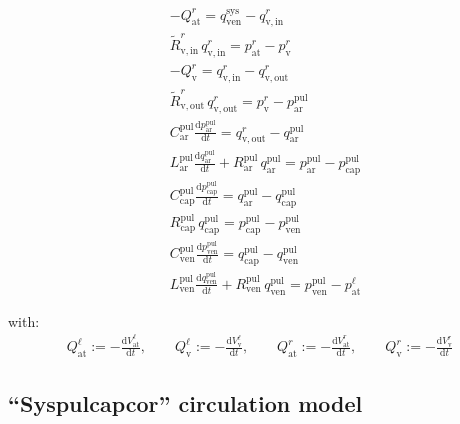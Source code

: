\documentclass[a4paper,12pt]{report}
\begin{document}
\begin{align}
&-Q_{\mathrm{at}}^{r} = q_{\mathrm{ven}}^{\mathrm{sys}} - q_{\mathrm{v,in}}^{r}\nonumber\\
&\tilde{R}_{\mathrm{v,in}}^{r}\,q_{\mathrm{v,in}}^{r} = p_{\mathrm{at}}^{r}-p_{\mathrm{v}}^{r}\nonumber\\
&-Q_{\mathrm{v}}^{r} = q_{\mathrm{v,in}}^{r} - q_{\mathrm{v,out}}^{r}\nonumber\\
&\tilde{R}_{\mathrm{v,out}}^{r}\,q_{\mathrm{v,out}}^{r} = p_{\mathrm{v}}^{r}-p_{\mathrm{ar}}^{\mathrm{pul}}\nonumber\\
&C_{\mathrm{ar}}^{\mathrm{pul}} \frac{\mathrm{d}p_{\mathrm{ar}}^{\mathrm{pul}}}{\mathrm{d}t} = q_{\mathrm{v,out}}^{r} - q_{\mathrm{ar}}^{\mathrm{pul}}\nonumber\\
&L_{\mathrm{ar}}^{\mathrm{pul}}\frac{\mathrm{d}q_{\mathrm{ar}}^{\mathrm{pul}}}{\mathrm{d}t} + R_{\mathrm{ar}}^{\mathrm{pul}}\,q_{\mathrm{ar}}^{\mathrm{pul}}=p_{\mathrm{ar}}^{\mathrm{pul}} -p_{\mathrm{cap}}^{\mathrm{pul}}\nonumber\\
&C_{\mathrm{cap}}^{\mathrm{pul}} \frac{\mathrm{d}p_{\mathrm{cap}}^{\mathrm{pul}}}{\mathrm{d}t} = q_{\mathrm{ar}}^{\mathrm{pul}} - q_{\mathrm{cap}}^{\mathrm{pul}}\nonumber\\
&R_{\mathrm{cap}}^{\mathrm{pul}}\,q_{\mathrm{cap}}^{\mathrm{pul}}=p_{\mathrm{cap}}^{\mathrm{pul}}-p_{\mathrm{ven}}^{\mathrm{pul}}\nonumber\\
&C_{\mathrm{ven}}^{\mathrm{pul}} \frac{\mathrm{d}p_{\mathrm{ven}}^{\mathrm{pul}}}{\mathrm{d}t} = q_{\mathrm{cap}}^{\mathrm{pul}} - q_{\mathrm{ven}}^{\mathrm{pul}}\nonumber\\
&L_{\mathrm{ven}}^{\mathrm{pul}}\frac{\mathrm{d}q_{\mathrm{ven}}^{\mathrm{pul}}}{\mathrm{d}t} + R_{\mathrm{ven}}^{\mathrm{pul}}\, q_{\mathrm{ven}}^{\mathrm{pul}}=p_{\mathrm{ven}}^{\mathrm{pul}}-p_{\mathrm{at}}^{\ell}\nonumber
\end{align}

with:
\begin{align}
Q_{\mathrm{at}}^{\ell} := -\frac{\mathrm{d}V_{\mathrm{at}}^{\ell}}{\mathrm{d}t}, \qquad
Q_{\mathrm{v}}^{\ell} := -\frac{\mathrm{d}V_{\mathrm{v}}^{\ell}}{\mathrm{d}t}, \qquad
Q_{\mathrm{at}}^{r} := -\frac{\mathrm{d}V_{\mathrm{at}}^{r}}{\mathrm{d}t}, \qquad
Q_{\mathrm{v}}^{r} := -\frac{\mathrm{d}V_{\mathrm{v}}^{r}}{\mathrm{d}t}\nonumber
\end{align}



\subsection{``Syspulcapcor'' circulation model}
\end{document}

